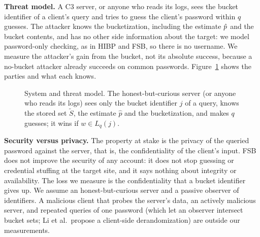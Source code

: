 \textbf{Threat model.} A C3 server, or anyone who reads its logs, sees the bucket identifier of a client's query and tries to guess the client's password within $q$ guesses. The attacker knows the bucketization, including the estimate $\hat p$ and the bucket contents, and has no other side information about the target: we model password-only checking, as in HIBP and FSB, so there is no username. We measure the attacker's gain from the bucket, not its absolute success, because a no-bucket attacker already succeeds on common passwords. Figure~\ref{fig:system} shows the parties and what each knows.

\begin{figure}[t]
\centering
{}
\caption{System and threat model. The honest-but-curious server (or anyone who reads its logs) sees only the bucket identifier $j$ of a query, knows the stored set $\tilde S$, the estimate $\hat p$ and the bucketization, and makes $q$ guesses; it wins if $w\in L_q(j)$.}
\label{fig:system}
\end{figure}

\textbf{Security versus privacy.} The property at stake is the privacy of the queried password against the server, that is, the confidentiality of the client's input. FSB does not improve the security of any account: it does not stop guessing or credential stuffing at the target site, and it says nothing about integrity or availability. The loss we measure is the confidentiality that a bucket identifier gives up. We assume an honest-but-curious server and a passive observer of identifiers. A malicious client that probes the server's data, an actively malicious server, and repeated queries of one password (which let an observer intersect bucket sets; Li et al.\ propose a client-side derandomization) are outside our measurements.

